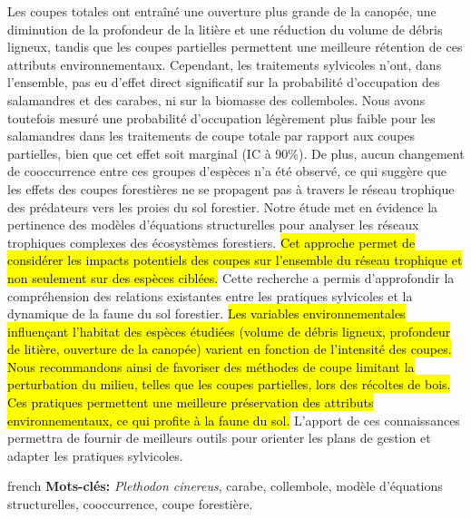 Les coupes totales ont entraîné une ouverture plus grande de la canopée, une diminution de la profondeur de la litière et une réduction du volume de débris ligneux, 
tandis que les coupes partielles permettent une meilleure rétention de ces attributs environnementaux. 
Cependant, les traitements sylvicoles n’ont, dans l’ensemble, pas eu d’effet direct significatif sur la probabilité d’occupation des salamandres et des carabes, ni sur la biomasse des collemboles. 
Nous avons toutefois mesuré une probabilité d’occupation légèrement plus faible pour les salamandres dans les traitements de coupe totale par rapport aux coupes partielles, bien que cet effet soit marginal (IC à 90\%). 
De plus, aucun changement de cooccurrence entre ces groupes d’espèces n’a été observé, ce qui suggère que les effets des coupes forestières ne se propagent pas à travers le réseau trophique des prédateurs vers les proies du sol forestier. 
Notre étude met en évidence la pertinence des modèles d’équations structurelles pour analyser les réseaux trophiques complexes des écosystèmes forestiers. 
\hl{Cet approche permet de considérer les impacts potentiels des coupes sur l’ensemble du réseau trophique et non seulement sur des espèces ciblées.} 
Cette recherche a permis d'approfondir la compréhension des relations existantes entre les pratiques sylvicoles et la dynamique de la faune du sol forestier. 
\hl{Les variables environnementales influençant l’habitat des espèces étudiées (volume de débris ligneux, profondeur de litière, ouverture de la canopée) varient en fonction de l’intensité des coupes. 
Nous recommandons ainsi de favoriser des méthodes de coupe limitant la perturbation du milieu, telles que les coupes partielles, lors des récoltes de bois. 
Ces pratiques permettent une meilleure préservation des attributs environnementaux, ce qui profite à la faune du sol.} 
L'apport de ces connaissances permettra de fournir de meilleurs outils pour orienter les plans de gestion et adapter les pratiques sylvicoles. 



\begin{otherlanguage*}{french}
\textbf{Mots-clés:} \textit{Plethodon cinereus}, carabe, collembole, modèle d'équations structurelles, cooccurrence, coupe forestière.
\end{otherlanguage*}
